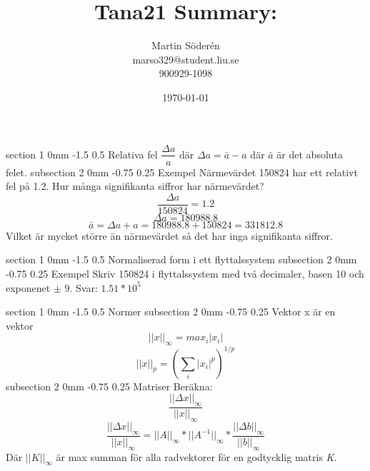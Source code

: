 \documentclass[a4paper,11pt]{article}
\makeatletter
\renewcommand{\section}{\@startsection
   {section}%
   {1}%
   {0mm}%
   {-1.5\baselineskip}%
   {0.5\baselineskip}%
   {\sffamily\bfseries\upshape\normalsize}}%
\renewcommand{\subsection}{\@startsection
   {subsection}%
   {2}%
   {0mm}%
   {-0.75\baselineskip}%
   {0.25\baselineskip}%
   {\rmfamily\normalfont\slshape\normalsize}}%
\makeatother
\begin{document}
\begin{titlepage}
\title{Tana21 Summary:}
\author{Martin Söderén\\ marso329@student.liu.se\\900929-1098}
\date{\today}
\maketitle
\vfill %
\thispagestyle{empty}
\end{titlepage}
\section{Relativa fel}
$\dfrac{\Delta a}{a}$ där $\Delta a=\bar{a}-a$ där $\bar{a}$ är det absoluta felet.
\subsection{Exempel}
Närmevärdet 150824 har ett relativt fel på 1.2. Hur många signifikanta siffror har närmevärdet? 
$$\dfrac{\Delta a}{150824}=1.2$$
$$\Delta a=180988.8$$ 
$$\bar{a}=\Delta a +a=180988.8+150824=331812.8$$
Vilket är mycket större än närmevärdet så det har inga signifikanta siffror.

\section{Normaliserad form i ett flyttalssystem}
\subsection{Exempel}
Skriv 150824 i flyttalssystem med två decimaler, basen 10 och exponenet $\pm$ 9. Svar:
$1.51*10^5$

\section{Normer}
\subsection{Vektor}
x är en vektor
$$||x||_\infty=max_i |x_i|$$ 
$$||x||_p=(\sum_i|x_i|^p)^{1/p}$$
\subsection{Matriser}
Beräkna:
$$\dfrac{||\Delta x||_{\infty}}{||x||_{\infty}}$$
$$\dfrac{||\Delta x||_{\infty}}{||x||_{\infty}}=||A||_{\infty}*||A^{-1}||_{\infty}*\dfrac{||\Delta b||_{\infty}}{||b||_{\infty}}$$
Där
$||K||_{\infty}$ är max summan för alla radvektorer för en godtycklig matris \textit{K}.
\end{document}
